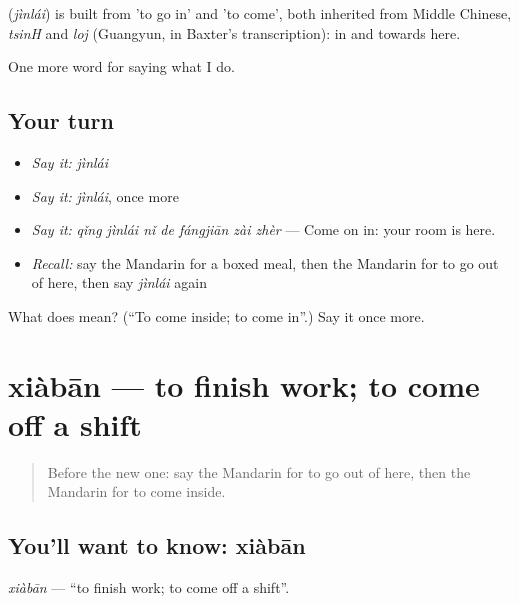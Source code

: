 \begin{cousinweb}
\textbf{} (\emph{jìnlái}) is built from  'to go in' and  'to come', both inherited from Middle Chinese, \emph{tsinH} and \emph{loj} (Guangyun, in Baxter's transcription): in and towards here.
\end{cousinweb}

\begin{grammarlens}[title={What you've built}]
One more word for saying what I do.
\end{grammarlens}

\subsection*{Your turn}
\begin{itemize}
\raggedright
  \item \emph{Say it:} \emph{jìnlái}
  \item \emph{Say it:} \emph{jìnlái}, once more
  \item \emph{Say it:} \emph{qǐng jìnlái nǐ de fángjiān zài zhèr} — Come on in: your room is here.
  \item \emph{Recall:} say the Mandarin for a boxed meal, then the Mandarin for to go out of here, then say \emph{jìnlái} again
\end{itemize}

\begin{tcolorbox}[breakable,colback=teal!4,colframe=teal!35!black,title={Before you move on}]
What does  mean? (\textquotedblleft{}To come inside; to come in\textquotedblright{}.) Say it once more.
\end{tcolorbox}
\section[xiàbān]{xiàbān — to finish work; to come off a shift}

\label{lesson:ZH-C183-xiaban}



\begin{quote}
Before the new one: say the Mandarin for to go out of here, then the Mandarin for to come inside.
\end{quote}

\subsection*{You'll want to know: xiàbān}
\emph{xiàbān} — \textquotedblleft{}to finish work; to come off a shift\textquotedblright{}.

